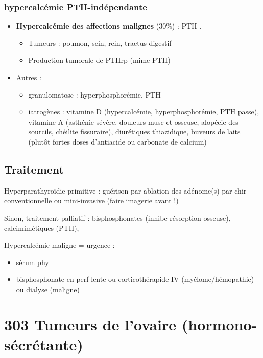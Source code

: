 \documentclass{book}
\begin{document}
\subsubsection{hypercalcémie PTH-indépendante}
\label{sec:orgf96bb0e}
\begin{itemize}
\item \textbf{Hypercalcémie des affections malignes} (30\%) : PTH \dec\dec{}. 
\begin{itemize}
\item Tumeurs : poumon, sein, rein, tractus digestif
\item Production tumorale de PTHrp (mime PTH)
\end{itemize}
\item Autres : 
\begin{itemize}
\item granulomatose : hyperphosphorémie, PTH \dec
\item iatrogènes : vitamine D (hypercalcémie, hyperphosphorémie, PTH passe),
vitamine A (asthénie sévère, douleurs musc et osseuse, alopécie des
sourcils, chéilite fissuraire), diurétiques thiazidique, buveurs de laits
(plutôt fortes doses d'antiacide ou carbonate de calcium)
\end{itemize}
\end{itemize}

\subsection{Traitement}
\label{sec:org33d9c48}
Hyperparathyroïdie primitive : guérison par ablation des adénome(s) par chir
conventionnelle ou mini-invasive (faire imagerie avant !)

Sinon, traitement palliatif : bisphosphonates (inhibe résorption osseuse),
calcimimétiques (\dec PTH), 

\danger Hypercalcémie maligne = urgence \faBomb{} : 
\begin{itemize}
\item sérum phy
\item bisphosphonate en perf lente ou corticothérapide IV (myélome/hémopathie) ou dialyse (maligne)
\end{itemize}
\section{303 \textdagger{} Tumeurs de l'ovaire (hormono-sécrétante)}
\label{sec:orgcb19f65}
\end{document}

